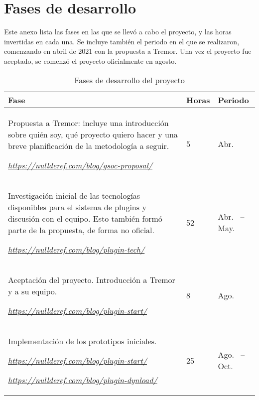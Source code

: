 \chapter{Fases de desarrollo}\label{annex:hours}

Este anexo lista las fases en las que se llevó a cabo el proyecto, y las horas
invertidas en cada una. Se incluye también el periodo en el que se realizaron,
comenzando en abril de 2021 con la propuesta a Tremor. Una vez el proyecto fue
aceptado, se comenzó el proyecto oficialmente en agosto.


\begin{longtable}[H]{| m{9.7cm} | P{1.3cm} | P{3.4cm} |}
\caption{Fases de desarrollo del proyecto}\\

\hline
\textbf{Fase}
    & \textbf{Horas}
    & \textbf{Periodo} \\

\hline
Propuesta a Tremor: incluye una introducción sobre quién soy, qué proyecto
quiero hacer y una breve planificación de la metodología a seguir.

\vspace{5mm}
\emph{\url{https://nullderef.com/blog/gsoc-proposal/}}
    & 5
    & Abr.~ \\

\hline
Investigación inicial de las tecnologías disponibles para el sistema de
plugins y discusión con el equipo. Esto también formó parte de la propuesta, de
forma no oficial.

\vspace{4mm}
\emph{\url{https://nullderef.com/blog/plugin-tech/}}
    & 52
    & Abr.~ -- May.~ \\

\hline
Aceptación del proyecto. Introducción a Tremor y a su equipo.

\vspace{4mm}
\emph{\url{https://nullderef.com/blog/plugin-start/}}
    & 8
    & Ago.~ \\

\hline
Implementación de los prototipos iniciales.

\vspace{4mm}
\emph{\url{https://nullderef.com/blog/plugin-start/}}

\vspace{4mm}
\emph{\url{https://nullderef.com/blog/plugin-dynload/}}
    & 25
    & Ago.~ -- Oct.~ \\


\end{longtable}

